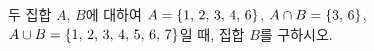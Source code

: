 두 집합 $A$, $B$에 대하여 $A=\{1,\mkern3mu 2,\mkern3mu 3,\mkern3mu 4,\mkern3mu 6\}$, $A\cap B=\{3,\mkern3mu 6\}$, $A\cup B=\{1,\mkern3mu 2,\mkern3mu 3,\mkern3mu 4,\mkern3mu 5,\mkern3mu 6,\mkern3mu 7\}$일 때, 집합 $B$를 구하시오.
